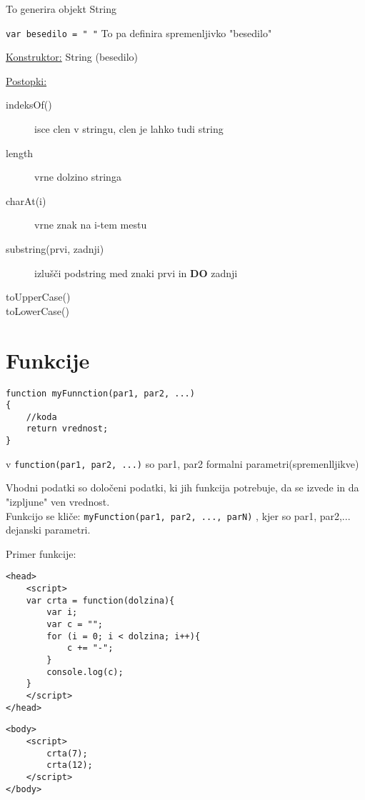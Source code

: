 {\centering{}\par} To generira objekt String\

\texttt{var besedilo = " "} To pa definira spremenljivko "besedilo"\

\underline{Konstruktor:} String (besedilo)


\underline{Postopki:}

\begin{description}
	\item[indeksOf()] isce clen v stringu, clen je lahko tudi string
	\item[length] vrne dolzino stringa
	\item[charAt(i)] vrne znak na i-tem mestu
	\item[substring(prvi, zadnji)] izlušči podstring med znaki prvi in  \textbf{DO} zadnji
	\item[toUpperCase()]
	\item[toLowerCase()]
\end{description}
\newpage
\section{Funkcije}

\begin{verbatim}
function myFunnction(par1, par2, ...)
{
    //koda
    return vrednost;
}
\end{verbatim}

v \texttt{function(par1, par2, ...)} so par1, par2 formalni parametri(spremenlljikve)
 
Vhodni podatki so določeni podatki, ki jih funkcija potrebuje, da se izvede in da "izpljune" ven vrednost.\\

Funkcijo se kliče: \texttt{myFunction(par1, par2, ..., parN)} , kjer so par1, par2,... dejanski parametri.

Primer funkcije:

\begin{verbatim}
<head>
    <script>
    var crta = function(dolzina){
        var i;
        var c = "";
        for (i = 0; i < dolzina; i++){
            c += "-";
        }
        console.log(c);
    }
    </script>
</head>
\end{verbatim}
\begin{verbatim}
<body>
    <script>
        crta(7);
        crta(12);
    </script>
</body>
\end{verbatim}

